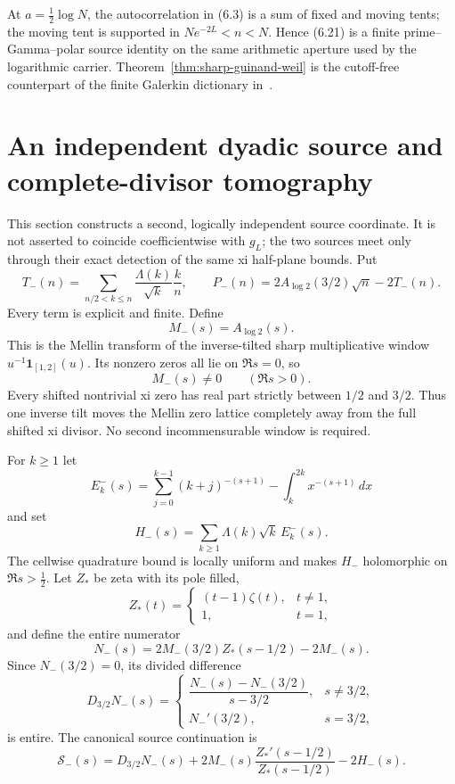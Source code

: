 \documentclass[11pt]{article}
\newcommand{\cS}{\mathcal S}
\begin{document}
At $a=\frac12\log N$, the autocorrelation in \textup{(6.3)} is a sum of fixed and moving tents;
the moving tent is supported in $Ne^{-2L}<n<N$.  Hence \textup{(6.21)} is a finite
prime--Gamma--polar source identity on the same arithmetic aperture used by the logarithmic
carrier.  Theorem~\ref{thm:sharp-guinand-weil} is the cutoff-free counterpart of the finite
Galerkin dictionary in~\cite{Groskin2026}.

\section{An independent dyadic source and complete-divisor tomography}

This section constructs a second, logically independent source coordinate.  It is not asserted
to coincide coefficientwise with $g_L$; the two sources meet only through their exact detection
of the same xi half-plane bounds.  Put
\[
 T_-(n)=\sum_{n/2<k\le n}
   \frac{\Lambda(k)}{\sqrt{k}}\frac{k}{n},\qquad
 P_-(n)=2A_{\log2}(3/2)\sqrt n-2T_-(n).
 \tag{7.1}
\]
Every term is explicit and finite.  Define
\[
 M_-(s)=A_{\log2}(s).
 \tag{7.2}
\]
This is the Mellin transform of the inverse-tilted sharp multiplicative window
$u^{-1}\mathbf1_{[1,2]}(u)$.  Its nonzero zeros all lie on $\Re s=0$, so
\[
 M_-(s)\ne0\qquad(\Re s>0).
 \tag{7.3}
\]
Every shifted nontrivial xi zero has real part strictly between $1/2$ and $3/2$.
Thus one inverse tilt moves the Mellin zero lattice completely away from the full shifted xi
divisor.  No second incommensurable window is required.

For $k\ge1$ let
\[
 E_k^-(s)=\sum_{j=0}^{k-1}(k+j)^{-(s+1)}
             -\int_k^{2k}x^{-(s+1)}\,dx
 \tag{7.4}
\]
and set
\[
 H_-(s)=\sum_{k\ge1}\Lambda(k)\sqrt{k}\,E_k^-(s).
 \tag{7.5}
\]
The cellwise quadrature bound is locally uniform and makes $H_-$ holomorphic on
$\Re s>\frac12$.  Let $Z_*$ be zeta with its pole filled,
\[
 Z_*(t)=
 \begin{cases}
  (t-1)\zeta(t),&t\ne1,\\
  1,&t=1,
 \end{cases}
 \tag{7.6}
\]
and define the entire numerator
\[
 N_-(s)=2M_-(3/2)Z_*(s-1/2)-2M_-(s).
 \tag{7.7}
\]
Since $N_-(3/2)=0$, its divided difference
\[
 D_{3/2}N_-(s)=
 \begin{cases}
  \dfrac{N_-(s)-N_-(3/2)}{s-3/2},&s\ne3/2,\\[6pt]
  N_-'(3/2),&s=3/2,
 \end{cases}
\]
is entire.  The canonical source continuation is
\[
 \cS_-(s)=D_{3/2}N_-(s)
   +2M_-(s)\frac{Z_*'(s-1/2)}{Z_*(s-1/2)}-2H_-(s).
 \tag{7.8}
\]
\end{document}
